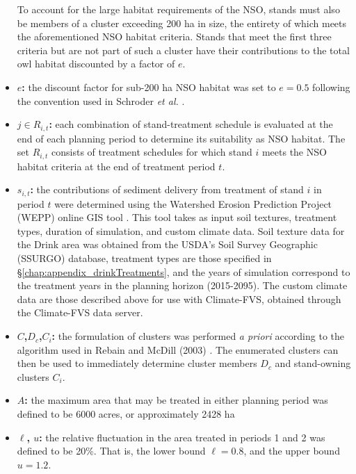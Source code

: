 \begin{itemize}
To account for the large habitat requirements of the NSO, stands must also be members of a cluster exceeding 200 ha in size, the entirety of which meets the aforementioned NSO habitat criteria. Stands that meet the first three criteria but are not part of such a cluster have their contributions to the total owl habitat discounted by a factor of $e$.
\item \textbf{$e$:} the discount factor for sub-200 ha NSO habitat was set to $e = 0.5$ following the convention used in Schroder \textit{et al.} \cite{schroder2016multi}.
\item \textbf{$j \in R_{i,t}$:} each combination of stand-treatment schedule is evaluated at the end of each planning period to determine its suitability as NSO habitat. The set $R_{i,t}$ consists of treatment schedules for which stand $i$ meets the NSO habitat criteria at the end of treatment period $t$. 
\item \textbf{$s_{i,t}$:} the contributions of sediment delivery from treatment of stand $i$ in period $t$ were determined using the Watershed Erosion Prediction Project (WEPP) online GIS tool \cite{frankenberger2011development}. This tool takes as input soil textures, treatment types, duration of simulation, and custom climate data. Soil texture data for the Drink area was obtained from the USDA's Soil Survey Geographic (SSURGO) database, treatment types are those specified in \S \ref{chap:appendix_drinkTreatments}, and the years of simulation correspond to the treatment years in the planning horizon (2015-2095). The custom climate data are those described above for use with Climate-FVS, obtained through the Climate-FVS data server.
\item \textbf{$C$,$D_c$,$C_i$:} the formulation of clusters was performed \textit{a priori} according to the algorithm used in Rebain and McDill (2003) \cite{rebain2003mixed}. The enumerated clusters can then be used to immediately determine cluster members $D_c$ and stand-owning clusters $C_i$.
\item \textbf{$A$:} the maximum area that may be treated in either planning period was defined to be 6000 acres, or approximately 2428 ha
\item \textbf{$\ell$, $u$:} the relative fluctuation in the area treated in periods 1 and 2 was defined to be 20\%. That is, the lower bound $\ell = 0.8$, and the upper bound $u = 1.2$.
\end{itemize}
